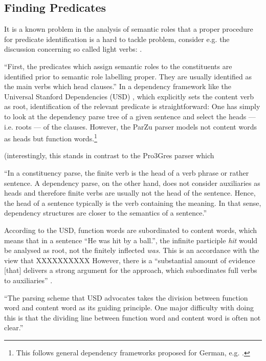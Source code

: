 \subsection{Finding Predicates}

It is a known problem in the analysis of semantic roles that a proper procedure for predicate identification is a hard to tackle problem, consider e.g. the discussion concerning so called light verbs: \cite{wittenberg2016light}.

``First, the predicates which assign semantic roles to the constituents are identified prior to semantic role labelling proper. They are usually identified as the main verbs which head clauses.'' \citep[p.~74]{samardzic2013dynamics}
In a dependency framework like the Universal Stanford Dependencies (USD) \citep{de2014universal}, which explicitly sets the content verb as root, identification of the relevant predicate is straightforward:
One has simply to look at the dependency parse tree of a given sentence and select the heads --- i.e. roots --- of the clauses.
However, the ParZu parser models not content words as heads but function words.\footnote{This follows general dependency frameworks proposed for German, e.g. \cite{gerdes2001word, gross2015dependency}.}

(interestingly, this stands in contrast to the Pro3Gres parser \citep{schneider2008hybrid} which 

``In a constituency parse, the finite verb is the head of a verb phrase or rather sentence.
A dependency parse, on the other hand, does not consider auxiliaries as heads and therefore finite verbs are usually not the head of the sentence.
Hence, the head of a sentence typically is the verb containing the meaning.
In that sense, dependency structures are closer to the semantics of a sentence.'' \citep[p.~6f.]{aepli2018parsing}

According to the USD, function words are subordinated to content words, which means that in a sentence ``He was hit by a ball.'', the infinite participle \textit{hit} would be analysed as root, not the finitely inflected \textit{was}.
This is an accordance with the view that XXXXXXXXXX
However, there is a ``substantial amount of evidence [that] delivers a strong argument for the \textelp{} approach, which subordinates full verbs to auxiliaries'' \cite{gross2015dependency}.

``The parsing scheme that USD advocates takes the division between function word and content word as its guiding principle.
One major difficulty with doing this is that the dividing line between function word and content word is often not clear.'' \cite{gross2015dependency}


